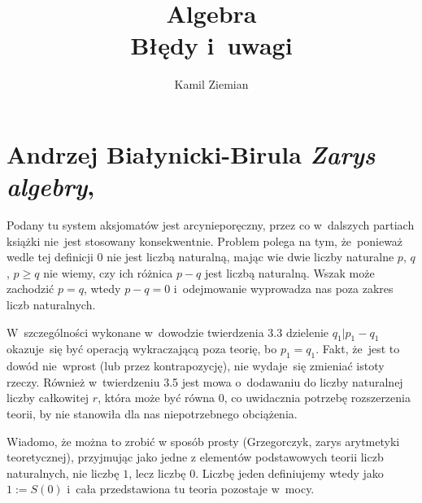 \documentclass[a4paper,11pt]{article}
\title{Algebra \\
  {\Large Błędy i~uwagi}}
\author{Kamil Ziemian}
\numberwithin{equation}{section}
\begin{document}





\maketitle %





\section{Andrzej Białynicki-Birula
  \textit{Zarys algebry}, \cite{BialynickiBirulaZarysAlgebry1987}}

\vspace{0em}



\vspace{0em}


\noindent
{} Podany tu system aksjomatów jest arcynieporęczny, przez co
w~dalszych partiach książki nie~jest stosowany konsekwentnie. Problem
polega na tym, że~ponieważ wedle tej definicji 0 nie jest liczbą
naturalną, mając wie dwie liczby naturalne $p$, $q$, $p \geq q$ nie
wiemy, czy ich różnica $p - q$ jest liczbą naturalną. Wszak może
zachodzić $p = q$, wtedy $p - q = 0$ i~odejmowanie wyprowadza nas poza
zakres liczb naturalnych.

W~szczególności wykonane w~dowodzie twierdzenia 3.3 dzielenie
$q_{ 1 } | p_{ 1 } - q_{ 1 }$ okazuje~się być operacją wykraczającą
poza teorię, bo $p_{ 1 } = q_{ 1 }$. Fakt, że~jest to dowód nie~wprost
(lub przez kontrapozycję), nie wydaje~się zmieniać istoty rzeczy.
Również w~twierdzeniu 3.5 jest mowa o~dodawaniu do liczby naturalnej
liczby całkowitej $r$, która może być równa 0, co uwidacznia potrzebę
rozszerzenia teorii, by nie stanowiła dla nas niepotrzebnego
obciążenia.

Wiadomo, że można to zrobić w sposób prosty (Grzegorczyk, zarys
arytmetyki teoretycznej), przyjmując jako jedne z elementów
podstawowych teorii liczb naturalnych, nie liczbę $1$, lecz liczbę
$0$. Liczbę jeden definiujemy wtedy jako $1 := S( 0 )$ i~cała
przedstawiona tu teoria pozostaje w~mocy.
\end{document}
